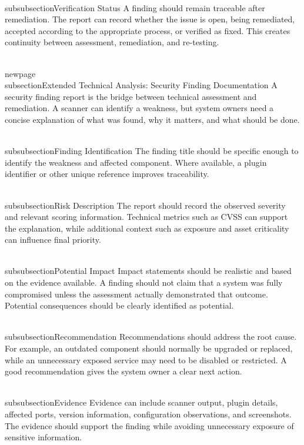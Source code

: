 \documentclass[11pt,a4paper]{article}
\begin{document}
\\subsubsection{Verification Status}
A finding should remain traceable after remediation. The report can record whether the issue is open, being remediated, accepted according to the appropriate process, or verified as fixed. This creates continuity between assessment, remediation, and re-testing.

\\newpage
\\subsection{Extended Technical Analysis: Security Finding Documentation}
A security finding report is the bridge between technical assessment and remediation. A scanner can identify a weakness, but system owners need a concise explanation of what was found, why it matters, and what should be done.

\\subsubsection{Finding Identification}
The finding title should be specific enough to identify the weakness and affected component. Where available, a plugin identifier or other unique reference improves traceability.

\\subsubsection{Risk Description}
The report should record the observed severity and relevant scoring information. Technical metrics such as CVSS can support the explanation, while additional context such as exposure and asset criticality can influence final priority.

\\subsubsection{Potential Impact}
Impact statements should be realistic and based on the evidence available. A finding should not claim that a system was fully compromised unless the assessment actually demonstrated that outcome. Potential consequences should be clearly identified as potential.

\\subsubsection{Recommendation}
Recommendations should address the root cause. For example, an outdated component should normally be upgraded or replaced, while an unnecessary exposed service may need to be disabled or restricted. A good recommendation gives the system owner a clear next action.

\\subsubsection{Evidence}
Evidence can include scanner output, plugin details, affected ports, version information, configuration observations, and screenshots. The evidence should support the finding while avoiding unnecessary exposure of sensitive information.
\end{document}
